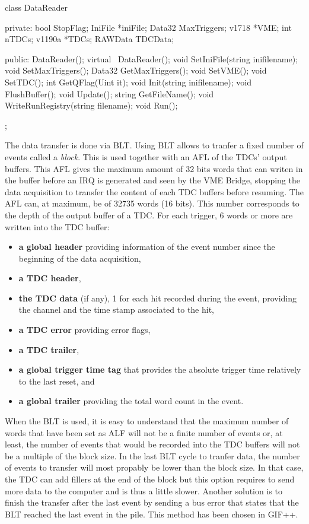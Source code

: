 	\begin{cppcode}
class DataReader
{
    private:
        bool     StopFlag;
        IniFile *iniFile;
        Data32   MaxTriggers;
        v1718   *VME;
        int      nTDCs;
        v1190a  *TDCs;
        RAWData  TDCData;

    public:
        DataReader();
        virtual ~DataReader();
        void     SetIniFile(string inifilename);
        void     SetMaxTriggers();
        Data32   GetMaxTriggers();
        void     SetVME();
        void     SetTDC();
        int      GetQFlag(Uint it);
        void     Init(string inifilename);
        void     FlushBuffer();
        void     Update();
        string   GetFileName();
        void     WriteRunRegistry(string filename);
        void     Run();
};
    \end{cppcode}
	
	The data transfer is done via \acf{BLT}. Using BLT allows to tranfer a fixed number of events called a \textit{block}. This is used together with an \acf{AFL} of the TDCs' output buffers. This AFL gives the maximum amount of 32 bits words that can writen in the buffer before an \acf{IRQ} is generated and seen by the VME Bridge, stopping the data acquisition to transfer the content of each TDC buffers before resuming. The AFL can, at maximum, be of 32735 words (16 bits). This number corresponds to the depth of the output buffer of a TDC. For each trigger, 6 words or more are written into the TDC buffer:
	
	\begin{itemize}
		\item \textbf{a global header} providing information of the event number since the beginning of the data acquisition,
		\item \textbf{a TDC header},
		\item \textbf{the TDC data} (if any), 1 for each hit recorded during the event, providing the channel and the time stamp associated to the hit,
		\item \textbf{a TDC error} providing error flags,
		\item \textbf{a TDC trailer},
		\item \textbf{a global trigger time tag} that provides the absolute trigger time relatively to the last reset, and
		\item \textbf{a global trailer} providing the total word count in the event.
	\end{itemize}
	
	When the BLT is used, it is easy to understand that the maximum number of words that have been set as ALF will not be a finite number of events or, at least, the number of events that would be recorded into the TDC buffers will not be a multiple of the block size. In the last BLT cycle to tranfer data, the number of events to transfer will most propably be lower than the block size. In that case, the TDC can add fillers at the end of the block but this option requires to send more data to the computer and is thus a little slower. Another solution is to finish the transfer after the last event by sending a bus error that states that the BLT reached the last event in the pile. This method has been chosen in GIF++.\\
	
